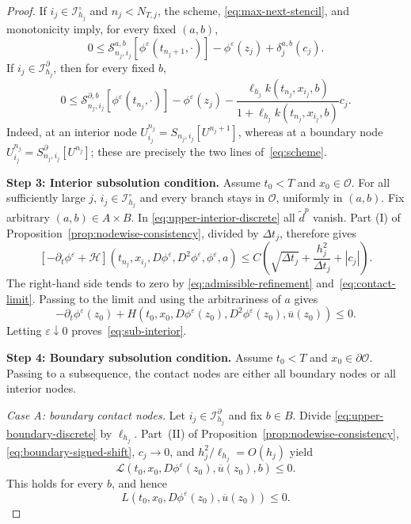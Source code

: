 \documentclass[10pt,a4paper]{amsart}
\newcommand{\cO}{\mathcal{O}}
\newcommand{\cS}{\mathcal{S}}
\newcommand{\dt}{\Delta t}
\begin{document}
\begin{proof}
		If $i_j\in\mathcal I_{h_j}^\circ$ and $n_j<N_{T,j}$, the scheme,
		\eqref{eq:max-next-stencil}, and monotonicity imply, for every fixed
		$(a,b)$,
		\begin{equation}
			0\le
			\cS_{n_j,i_j}^{a,b}[\phi^\varepsilon(t_{n_j+1},\cdot)]
			-\phi^\varepsilon(z_j)+\delta_j^{a,b}(c_j).
			\label{eq:upper-interior-discrete}
		\end{equation}
		If $i_j\in\mathcal I_{h_j}^\partial$, then for every fixed $b$,
		\begin{equation}
			0\le
			\cS_{n_j,i_j}^{\partial,b}[\phi^\varepsilon(t_{n_j},\cdot)]
			-\phi^\varepsilon(z_j)
			-\frac{\ell_{h_j}k(t_{n_j},x_{i_j},b)}
			{1+\ell_{h_j}k(t_{n_j},x_{i_j},b)}c_j.
			\label{eq:upper-boundary-discrete}
		\end{equation}
		Indeed, at an interior node
		$U_{i_j}^{n_j}=S_{n_j,i_j}[U^{n_j+1}]$, whereas at a boundary node
		$U_{i_j}^{n_j}=S_{n_j,i_j}^{\partial}[U^{n_j}]$; these are precisely the
		two lines of~\eqref{eq:scheme}.
		
		\medskip
		\noindent\textbf{Step 3: Interior subsolution condition.}
		Assume $t_0<T$ and $x_0\in\cO$.  For all sufficiently large $j$,
		$i_j\in\mathcal I_{h_j}^\circ$ and every branch stays in $\cO$, uniformly
		in $(a,b)$.  Fix arbitrary $(a,b)\in A\times B$.  In
		\eqref{eq:upper-interior-discrete} all $\widetilde d^p$ vanish.  Part
		\textup{(I)} of Proposition~\ref{prop:nodewise-consistency}, divided by
		$\dt_j$, therefore gives
		\[
		[-\partial_t\phi^\varepsilon+\mathcal H]
		(t_{n_j},x_{i_j},D\phi^\varepsilon,D^2\phi^\varepsilon,
		\phi^\varepsilon,a)
		\le C\left(\sqrt{\dt_j}+\frac{h_j^2}{\dt_j}+|c_j|\right).
		\]
		The right-hand side tends to zero by
		\eqref{eq:admissible-refinement} and~\eqref{eq:contact-limit}.  Passing to
		the limit and using the arbitrariness of $a$ gives
		\[
		-\partial_t\phi^\varepsilon(z_0)
		+H(t_0,x_0,D\phi^\varepsilon(z_0),D^2\phi^\varepsilon(z_0),
		\overline u(z_0))\le0.
		\]
		Letting $\varepsilon\downarrow0$ proves~\eqref{eq:sub-interior}.
		
		\medskip
		\noindent\textbf{Step 4: Boundary subsolution condition.}
		Assume $t_0<T$ and $x_0\in\partial\cO$.  Passing to a subsequence, the
		contact nodes are either all boundary nodes or all interior nodes.
		
		\smallskip
		\noindent\textit{Case A: boundary contact nodes.}
		Let $i_j\in\mathcal I_{h_j}^\partial$ and fix $b\in B$.  Divide
		\eqref{eq:upper-boundary-discrete} by $\ell_{h_j}$.  Part~\textup{(II)} of
		Proposition~\ref{prop:nodewise-consistency},
		\eqref{eq:boundary-signed-shift}, $c_j\to0$, and
		$h_j^2/\ell_{h_j}=O(h_j)$ yield
		\[
		\mathcal L(t_0,x_0,D\phi^\varepsilon(z_0),
		\overline u(z_0),b)\le0.
		\]
		This holds for every $b$, and hence
		\begin{equation}
			L(t_0,x_0,D\phi^\varepsilon(z_0),\overline u(z_0))\le0.
			\label{eq:boundary-node-sub}
		\end{equation}
		

\end{proof}
\end{document}
